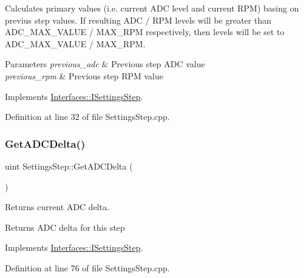 Calculates primary values (i.\+e. current A\+DC level and current R\+PM) basing on previus step values. If resulting A\+DC / R\+PM levels will be greater than A\+D\+C\+\_\+\+M\+A\+X\+\_\+\+V\+A\+L\+UE / M\+A\+X\+\_\+\+R\+PM respectively, then levels will be set to A\+D\+C\+\_\+\+M\+A\+X\+\_\+\+V\+A\+L\+UE / M\+A\+X\+\_\+\+R\+PM. 


\begin{DoxyParams}{Parameters}
{\em previous\+\_\+adc} & Previous step A\+DC value \\
\hline
{\em previous\+\_\+rpm} & Previous step R\+PM value \\
\hline
\end{DoxyParams}


Implements \hyperlink{class_interfaces_1_1_i_settings_step_a04e46c3ebe1f28e0ad0bce23fb863f66}{Interfaces\+::\+I\+Settings\+Step}.



Definition at line 32 of file Settings\+Step.\+cpp.

\mbox{\label{class_settings_step_aee30aaa97692d6b546e9dd002900f52e}} 
\subsubsection{\texorpdfstring{Get\+A\+D\+C\+Delta()}{GetADCDelta()}}
{\footnotesize\ttfamily uint Settings\+Step\+::\+Get\+A\+D\+C\+Delta (\begin{DoxyParamCaption}{ }\end{DoxyParamCaption})\hspace{0.3cm}{\ttfamily [virtual]}}



Returns current A\+DC delta. 

\begin{DoxyReturn}{Returns}
A\+DC delta for this step 
\end{DoxyReturn}


Implements \hyperlink{class_interfaces_1_1_i_settings_step_ab77c6eaa45707ec4932a8f432b13ad78}{Interfaces\+::\+I\+Settings\+Step}.



Definition at line 76 of file Settings\+Step.\+cpp.

\mbox{\label{class_settings_step_a443f5643d9b547632c261c5f3a4288f1}} 

